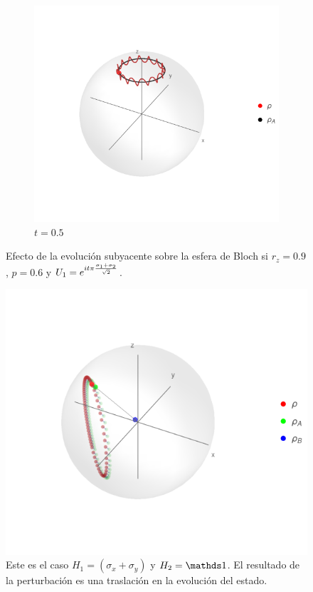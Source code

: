 \begin{figure}[h!]
    \begin{subfigure}{0.32\textwidth}
      \centering
      \includegraphics[width=0.9\linewidth]{maxent/figures/U1xU2_H1=sz_H2=10(sx+sy)_z=0.9_p=0.9.png}
      \caption{$t=0.5$}
    \end{subfigure}
    \caption{Efecto de la evolución subyacente sobre la esfera de Bloch si $r_{z}=0.9$, $p=0.6$ y $U_{1}=e^{it\pi \frac{\sigma_{1}+\sigma_{2}}{\sqrt{2}}}$.}
    \label{fig:NoErrorEvolution}
\end{figure}

\begin{figure}[h!]
    \centering
    \includegraphics[width=0.6\linewidth]{maxent/figures/U1xU2_H1=(sx+sy)_H2=Id_z=0.9_p=0.85_sequence.png}
    \caption{Este es el caso $H_{1}=(\sigma_{x}+\sigma_{y})$ y $H_{2}=\Id$. El resultado de la perturbación es una traslación en la evolución del estado.}
    \label{fig:SmallP1}
\end{figure}


